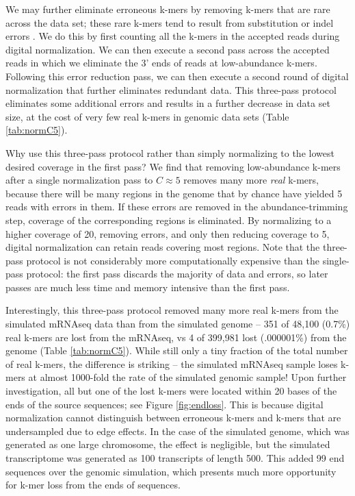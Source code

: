 \documentclass[10pt]{article}
\begin{document}
We may further eliminate erroneous k-mers by removing k-mers that are
rare across the data set; these rare k-mers tend to result from
substitution or indel errors \cite{pubmed21114842}.  We do this by
first counting all the k-mers in the accepted reads during digital
normalization.  We can then execute a second pass across the accepted
reads in which we eliminate the 3' ends of reads at low-abundance
k-mers.  Following this error reduction pass, we can then execute a
second round of digital normalization that further eliminates
redundant data.  This three-pass protocol eliminates some additional
errors and results in a further decrease in data set size, at the cost
of very few real k-mers in genomic data sets (Table \ref{tab:normC5}).

Why use this three-pass protocol rather than simply normalizing to the
lowest desired coverage in the first pass?  We find that removing
low-abundance k-mers after a single normalization pass to $C \approx
5$ removes many more {\em real} k-mers, because there will be many
regions in the genome that by chance have yielded 5 reads with errors
in them. If these errors are removed in the abundance-trimming step,
coverage of the corresponding regions is eliminated.  By normalizing
to a higher coverage of 20, removing errors, and only then reducing
coverage to 5, digital normalization can retain reads covering most
regions.  Note that the three-pass protocol is not considerably more
computationally expensive than the single-pass protocol: the first
pass discards the majority of data and errors, so later passes are
much less time and memory intensive than the first pass.

Interestingly, this three-pass protocol removed many more real k-mers
from the simulated mRNAseq data than from the simulated genome -- 351
of 48,100 (0.7\%) real k-mers are lost from the mRNAseq, vs 4 of
399,981 lost (.000001\%) from the genome (Table \ref{tab:normC5}).
While still only a tiny fraction of the total number of real k-mers,
the difference is striking -- the simulated mRNAseq sample loses k-mers
at almost 1000-fold the rate of the simulated genomic sample!  Upon
further investigation, all but one of the lost k-mers were located
within 20 bases of the ends of the source sequences; see Figure
\ref{fig:endloss}.  This is because digital normalization cannot
distinguish between erroneous k-mers and k-mers that are undersampled
due to edge effects.  In the case of the simulated genome, which was
generated as one large chromosome, the effect is negligible, but the
simulated transcriptome was generated as 100 transcripts of length
500.  This added 99 end sequences over the genomic simulation, which
presents much more opportunity for k-mer loss from the ends of
sequences.
\end{document}
